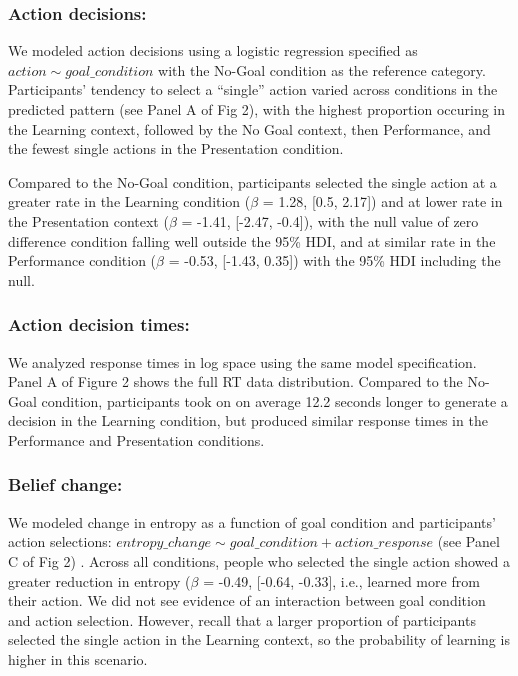 \documentclass[10pt, letterpaper]{article}
\begin{document}
\subsubsection{Action decisions:}\label{action-decisions}

We modeled action decisions using a logistic regression specified as
\texttt{$action \sim goal\_condition$} with the No-Goal condition as the
reference category. Participants' tendency to select a ``single'' action
varied across conditions in the predicted pattern (see Panel A of Fig
2), with the highest proportion occuring in the Learning context,
followed by the No Goal context, then Performance, and the fewest single
actions in the Presentation condition.

Compared to the No-Goal condition, participants selected the single
action at a greater rate in the Learning condition (\(\beta\) = 1.28,
{[}0.5, 2.17{]}) and at lower rate in the Presentation context
(\(\beta\) = -1.41, {[}-2.47, -0.4{]}), with the null value of zero
difference condition falling well outside the 95\% HDI, and at similar
rate in the Performance condition (\(\beta\) = -0.53, {[}-1.43, 0.35{]})
with the 95\% HDI including the null.

\subsubsection{Action decision times:}\label{action-decision-times}

We analyzed response times in log space using the same model
specification. Panel A of Figure 2 shows the full RT data distribution.
Compared to the No-Goal condition, participants took on on average 12.2
seconds longer to generate a decision in the Learning condition, but
produced similar response times in the Performance and Presentation
conditions.

\subsubsection{Belief change:}\label{belief-change}

We modeled change in entropy as a function of goal condition and
participants' action selections:
\texttt{$entropy\_change \sim goal\_condition + action\_response$} (see
Panel C of Fig 2) . Across all conditions, people who selected the
single action showed a greater reduction in entropy (\(\beta\) = -0.49,
{[}-0.64, -0.33{]}, i.e., learned more from their action. We did not see
evidence of an interaction between goal condition and action selection.
However, recall that a larger proportion of participants selected the
single action in the Learning context, so the probability of learning is
higher in this scenario.
\end{document}
